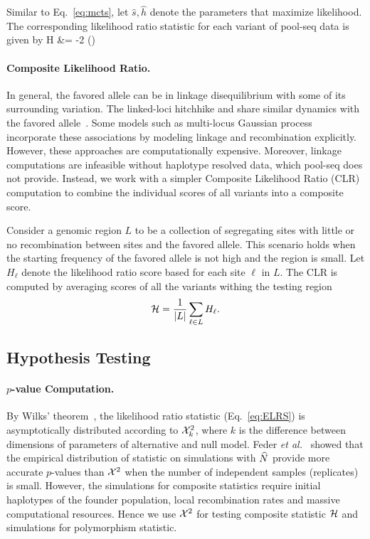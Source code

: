 Similar to Eq.~\ref{eq:mcts}, let $\hat{s},\hat{h}$ denote the
parameters that maximize likelihood. The corresponding likelihood
ratio statistic for each variant of pool-seq data is given by
\beq
	H &= -2 \log 
	\left(\right)\\
	\label{eq:ELRS}
\eeq

\paragraph{Composite Likelihood Ratio.}
In general, the favored allele can be in linkage disequilibrium with
some of its surrounding variation. The linked-loci hitchhike and share
similar dynamics with the favored allele~\cite{elyashiv2016genomic}.  Some
models such as
multi-locus Gaussian process~\cite{Terhorst2015Multi} incorporate
these associations by modeling linkage and recombination
explicitly. However, these approaches are computationally
expensive. Moreover, linkage computations are infeasible without
haplotype resolved data, which pool-seq does not provide. Instead, we
work with a simpler Composite Likelihood Ratio
(CLR)~\cite{nielsen2005genomic,williamson2007localizing} computation
to combine the individual scores of all variants into a composite
score.


Consider a genomic region $L$ to be a collection of segregating sites
with little or no recombination between sites and the favored
allele. This scenario holds when the starting frequency of the favored
allele is not high and the region is small. Let  $H_\ell$ denote the likelihood 
ratio score based for each site $\ell$ in $L$. The CLR is computed by 
averaging scores of all the variants
withing the testing region
\begin{equation}
 {\cal H} = \frac{1}{|L|}\sum_{\ell \in L} H_\ell.
\label{eq:pihmm}
\end{equation}


\subsection{Hypothesis Testing}
\paragraph{$p$-value Computation.}
By Wilks’ theorem~\cite{williams2001weighing}, the likelihood
ratio statistic (Eq.~\ref{eq:ELRS}) is asymptotically distributed
according to ${\cal X}^2_k$, where $k$ is the difference between dimensions of 
parameters of alternative and null model. Feder \emph{et
	al.}~\cite{feder2014Identifying} showed that the empirical
distribution of statistic on simulations with $\widehat{N}$ provide more accurate 
$p$-values than ${\cal X}^2$ when the
number of independent samples (replicates) is small. 
However, the simulations for composite statistics require initial haplotypes of 
the founder population, local recombination rates and massive computational 
resources. Hence we use ${\cal X}^2$ for testing composite statistic ${\cal H}$ and 
simulations for polymorphism statistic.

